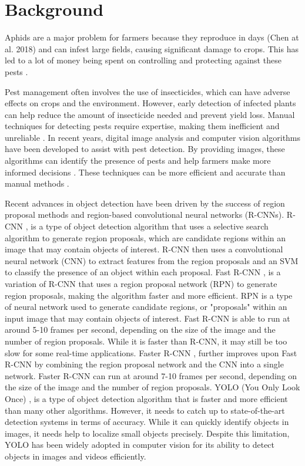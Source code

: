 \documentclass{article}
\begin{document}
    

\section{Background}
Aphids are a major problem for farmers because they reproduce in days (Chen at al. 2018)
and can infest large fields, causing significant damage to crops. 
This has led to a lot of money being spent on controlling and protecting against 
these pests \cite{CoarseToFine}.


Pest management often involves the use of insecticides, 
which can have adverse effects on crops and the environment. 
However, early detection of infected plants can help reduce the amount of insecticide needed and prevent yield loss. 
Manual techniques for detecting pests require expertise, making them inefficient and 
unreliable \cite{DetectionInWeatFields}. In recent years, digital image analysis and computer vision algorithms 
have been developed to assist with pest detection. By providing images, 
these algorithms can identify the presence of pests and help farmers make more informed decisions 
\cite{DetectionInWeatFields}. These techniques can be more efficient and accurate than manual methods \cite{DetectionInWeatFields}.


Recent advances in object detection have been driven by the success of region proposal methods and 
region-based convolutional neural networks (R-CNNs). 
R-CNN \cite{FasterRCNN}, is a type of object detection algorithm that uses a selective 
search algorithm to generate region proposals, which are candidate regions within an image that 
may contain objects of interest. R-CNN then uses a convolutional neural network (CNN) 
to extract features from the region proposals and an SVM to classify the presence of an 
object within each proposal. Fast R-CNN \cite{FasterRCNN}, 
is a variation of R-CNN that uses a region proposal network (RPN) to generate region proposals, 
making the algorithm faster and more efficient. RPN is a type of neural network used to generate candidate regions, 
or "proposals" within an input image that may contain objects of interest. 
Fast R-CNN is able to run at around 5-10 frames per second, depending on the size of the image 
and the number of region proposals. While it is faster than R-CNN, it may still be too slow for some 
real-time applications. Faster R-CNN \cite{FasterRCNN}, 
further improves upon Fast R-CNN by combining the region proposal network and the CNN into a single network. 
Faster R-CNN can run at around 7-10 frames per second, depending on the size of the image and 
the number of region proposals. YOLO (You Only Look Once) \cite{YOLO}, 
is a type of object detection algorithm that is faster and more efficient than many other algorithms. 
However, it needs to catch up to state-of-the-art detection systems in terms of accuracy. 
While it can quickly identify objects in images, it needs help to localize small objects precisely. 
Despite this limitation, YOLO has been widely adopted in computer vision for its ability to detect 
objects in images and videos efficiently.
\end{document}
